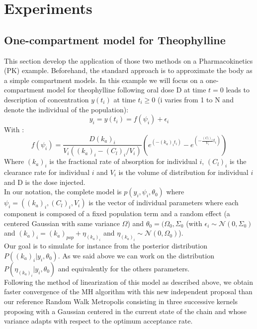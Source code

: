 \documentclass{article}
\begin{document}
\section{Experiments} 

\subsection{One-compartment model for Theophylline}
This section develop the application of those two methods on a Pharmacokinetics (PK) example. Beforehand, the standard approach is to approximate the body as a simple compartment models. In this example we will focus on a one-compartment model for theophylline following oral dose D at time $t=0$ leads to description of concentration $y(t_i)$ at time $t_i \geq 0$ (i varies from 1 to N and denote the individual of the population):
\begin{equation}
y_i = y(t_i) = f(\psi_i)+ \epsilon_i
\end{equation}
With :
\begin{equation}
f(\psi_i) = \frac{D(k_a)_i}{V_i((k_a)_i - (C_l)_i/V_i)}(e^{(-(k_a)_it_i)}-e^{(-\frac{(C_l)_i}{V_i}t_i)})
\end{equation}
Where $(k_a)_i$ is the fractional rate of absorption for individual $i$, $(C_l)_i$ is the clearance rate for individual $i$ and $V_i$ is the volume of distribution for individual $i$ and D is the dose injected.\\
In our notation, the complete model is $p(y_i,\psi_i,\theta_0)$ where $\psi_i = ((k_a)_i, (C_l)_i, V_i)$ is the vector of individual parameters where each component is composed of a fixed population term and a random effect (a centered Gaussian with same variance $\Omega$) and $\theta_0 = (\Omega_0, \Sigma_0$ (with $\epsilon_i \sim \mathcal{N}(0,\Sigma_0)$ and $(k_a)_i = (k_a)_{pop} + \eta_{(k_a)_i}$ and $\eta_{(k_a)_i} \sim \mathcal{N}(0,\Omega_0)$).\\
Our goal is to simulate for instance from the posterior distribution $P((k_a)_i|y_i,\theta_0)$. As we said above we can work on the distribution $P(\eta_{(k_a)_i}|y_i,\theta_0)$ and equivalently for the others parameters.\\
Following the method of linearization of this model as described above, we obtain faster convergence of the MH algorithm with this new independent proposal than our reference Random Walk Metropolis consisting in three successive kernels proposing with a Gaussian centered in the current state of the chain and whose variance adapts with respect to the optimum acceptance rate.
\end{document}
